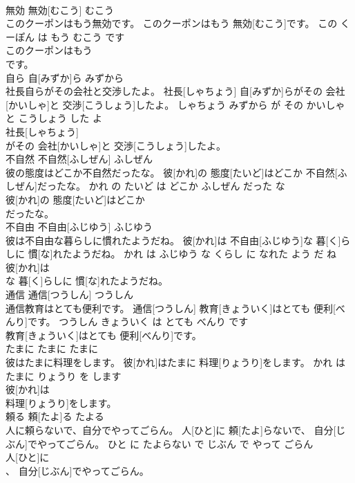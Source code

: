 \documentclass[8pt]{extreport}
\begin{document}
\begin{CJK}{UTF8}{min}
\\	無効	無効[むこう]	むこう	
\\	このクーポンはもう無効です。	このクーポンはもう 無効[むこう]です。	この くーぽん は もう むこう です	
\\	このクーポンはもう
\\	です。			
\\	自ら	自[みずか]ら	みずから	
\\	社長自らがその会社と交渉したよ。	社長[しゃちょう] 自[みずか]らがその 会社[かいしゃ]と 交渉[こうしょう]したよ。	しゃちょう みずから が その かいしゃ と こうしょう した よ	
\\	社長[しゃちょう]
\\	がその 会社[かいしゃ]と 交渉[こうしょう]したよ。			
\\	不自然	不自然[ふしぜん]	ふしぜん	
\\	彼の態度はどこか不自然だったな。	彼[かれ]の 態度[たいど]はどこか 不自然[ふしぜん]だったな。	かれ の たいど は どこか ふしぜん だった な	
\\	彼[かれ]の 態度[たいど]はどこか
\\	だったな。			
\\	不自由	不自由[ふじゆう]	ふじゆう	
\\	彼は不自由な暮らしに慣れたようだね。	彼[かれ]は 不自由[ふじゆう]な 暮[く]らしに 慣[な]れたようだね。	かれ は ふじゆう な くらし に なれた よう だ ね	
\\	彼[かれ]は
\\	な 暮[く]らしに 慣[な]れたようだね。			
\\	通信	通信[つうしん]	つうしん	
\\	通信教育はとても便利です。	通信[つうしん] 教育[きょういく]はとても 便利[べんり]です。	つうしん きょういく は とても べんり です	
\\	教育[きょういく]はとても 便利[べんり]です。			
\\	たまに	たまに	たまに	
\\	彼はたまに料理をします。	彼[かれ]はたまに 料理[りょうり]をします。	かれ は たまに りょうり を します	
\\	彼[かれ]は
\\	料理[りょうり]をします。			
\\	頼る	頼[たよ]る	たよる	
\\	人に頼らないで、自分でやってごらん。	人[ひと]に 頼[たよ]らないで、 自分[じぶん]でやってごらん。	ひと に たよらない で じぶん で やって ごらん	
\\	人[ひと]に
\\	、 自分[じぶん]でやってごらん。			

\end{CJK}
\end{document}
